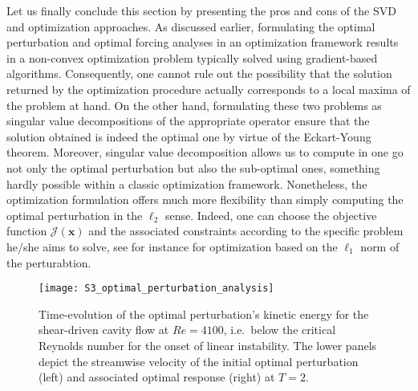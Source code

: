   Let us finally conclude this section by presenting the pros and cons of the SVD and optimization approaches. As discussed earlier, formulating the optimal perturbation and optimal forcing analyses in an optimization framework results in a non-convex optimization problem typically solved using gradient-based algorithms. Consequently, one cannot rule out the possibility that the solution returned by the optimization procedure actually corresponds to a local maxima of the problem at hand. On the other hand, formulating these two problems as singular value decompositions of the appropriate operator ensure that the solution obtained is indeed the optimal one by virtue of the Eckart-Young theorem. Moreover, singular value decomposition allows us to compute in one go not only the optimal perturbation but also the sub-optimal ones, something hardly possible within a classic optimization framework. Nonetheless, the optimization formulation offers much more flexibility than simply computing the optimal perturbation in the $\ell_2$ sense. Indeed, one can choose the objective function $\mathcal{J}(\mathbf{x})$ and the associated constraints according to the specific problem he/she aims to solve, see for instance \cite{jfm:foures:2013, jfm:foures:2014, fdr:farano:2016} for optimization based on the $\ell_1$ norm of the perturabtion.

  \begin{figure}
    \centering
    \texttt{[image: S3\_optimal\_perturbation\_analysis]}
    \caption{Time-evolution of the optimal perturbation's kinetic energy for the shear-driven cavity flow at $Re=4100$, i.e.\ below the critical Reynolds number for the onset of linear instability. The lower panels depict the streamwise velocity of the initial optimal perturbation (left) and associated optimal response (right) at $T=2$.}
    \label{fig: numerics -- illustration optimal perturbation analysis}
  \end{figure}

